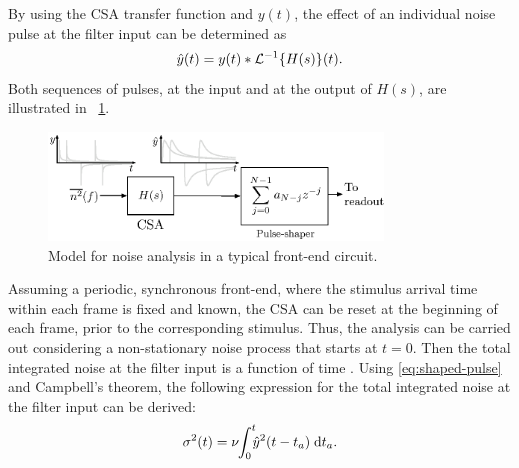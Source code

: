 By using the CSA transfer function and $y(t)$, the effect of an individual noise pulse at the filter input can be determined as
\begin{equation}
\hat{y}(t) = y(t) \ast \mathcal{L}^{-1}\!\left\{ H(s)\right\}\hspace{-0.15em}(t).\label{eq:shaped-pulse}
\end{equation}
Both sequences of pulses, at the input and at the output of $H(s)$, are illustrated in \figurename~\ref{fig:system}.

\begin{figure}[!t]
	\centering
	\includegraphics[width=3.5in]{./Figures/system.eps}
	\caption{Model for noise analysis in a typical \mbox{front-end} circuit.}\label{fig:system}
\end{figure}

Assuming a periodic, synchronous \mbox{front-end}, where the stimulus arrival time within each frame is fixed and known, the CSA can be reset at the beginning of each frame, prior to the corresponding stimulus. Thus, the analysis can be carried out considering a non-stationary noise process that starts at $t=0$. Then the total integrated noise at the filter input is a function of time \citep{radeka201}. Using \eqref{eq:shaped-pulse} and Campbell's theorem, the following expression for the total integrated noise at the filter input can be derived:
\begin{equation}
\sigma^2(t) = \nu\hspace{-.25em}\int_{0}^{t}\hspace{-.45em}\hat {y}^2(t-t_a)\;\mathrm{d}t_a\label{eq:envelope}.
\end{equation}

